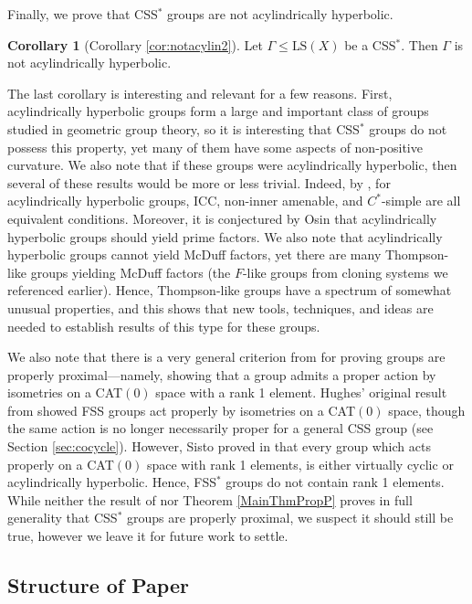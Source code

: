 \documentclass[12pt]{amsart}
\numberwithin{equation}{subsection}
\theoremstyle{definition}
\newtheorem{introcor}[introthm]{Corollary}
\theoremstyle{definition}
\theoremstyle{remark}
\begin{document}
Finally, we prove that CSS$^*$ groups are not acylindrically hyperbolic. 

\begin{introcor}[Corollary \ref{cor:notacylin2}]\label{mainthm:notacylin}
     Let $\Gamma \leq \text{LS}(X)$ be a CSS$^*$. Then $\Gamma$ is not acylindrically hyperbolic. 
\end{introcor}


The last corollary is interesting and relevant for a few reasons. First, acylindrically hyperbolic groups form a large and important class of groups studied in geometric group theory, so it is interesting that CSS$^*$ groups do not possess this property, yet many of them have some aspects of non-positive curvature. We also note that if these groups were acylindrically hyperbolic, then several of these results would be more or less trivial. Indeed, by \cite[Theorem 8.1]{dahmani2017hyperbolically}, for  acylindrically hyperbolic groups, ICC, non-inner amenable, and $C^*$-simple are all equivalent conditions. Moreover, it is conjectured by Osin that acylindrically hyperbolic groups should yield prime factors. We also note that acylindrically hyperbolic groups cannot yield McDuff factors, yet there are many Thompson-like groups yielding McDuff factors (the $F$-like groups from cloning systems we referenced earlier). Hence, Thompson-like groups have a spectrum of somewhat unusual properties, and this shows that new tools, techniques, and ideas are needed to establish results of this type for these groups.

We also note that there is a very general criterion from \cite{horbez2023proper} for proving groups are properly proximal---namely, showing that a group admits a proper action by isometries on a CAT$(0)$ space with a rank 1 element. Hughes' original result from \cite{hughes2009} showed FSS groups act properly by isometries on a CAT$(0)$ space, though the same action is no longer necessarily proper for a general CSS group (see Section \ref{sec:cocycle}). However, Sisto proved in \cite{Sisto2018} that every group which acts properly on a CAT$(0)$ space with rank 1 elements, is either virtually cyclic or acylindrically hyperbolic. Hence, FSS$^*$ groups do not contain rank 1 elements. While neither the result of \cite{horbez2023proper} nor Theorem \ref{MainThmPropP} proves in full generality that CSS$^*$ groups are properly proximal, we suspect it should still be true, however we leave it for future work to settle. 

\subsection*{Structure of Paper}
\end{document}
